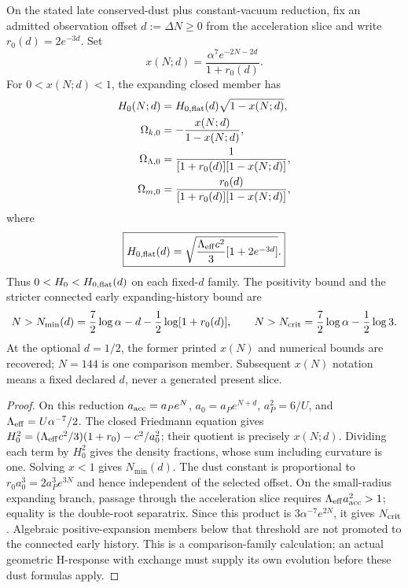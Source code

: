 \documentclass[12pt,a4paper]{article}
\begin{document}
\begin{theorem}
\label{p9:thm:closed-curvature-family-repaired}
On the stated late conserved-dust plus constant-vacuum reduction, fix
an admitted observation offset $d:=\Delta N\ge0$ from the acceleration
slice and write $r_0(d)=2e^{-3d}$. Set
\begin{equation}
\label{p9:eq:xN-def}
 x(N;d)=\frac{\alpha^7 e^{-2N-2d}}{1+r_0(d)}.
\end{equation}
For $0<x(N;d)<1$, the expanding closed member has
\begin{align}
 H_0(N;d)&=H_{0,\rm flat}(d)\sqrt{1-x(N;d)},\\
 \Omega_{k,0}&=-\frac{x(N;d)}{1-x(N;d)},\\
 \Omega_{\Lambda,0}&=\frac1{[1+r_0(d)][1-x(N;d)]},\\
 \Omega_{m,0}&=\frac{r_0(d)}{[1+r_0(d)][1-x(N;d)]},
 \label{p9:eq:closed-family}
\end{align}
where
\begin{equation}
\label{p9:eq:H0-flat-native}
 \boxed{H_{0,\rm flat}(d)=
 \sqrt{\frac{\Lambda_{\rm eff}c^2}{3}[1+2e^{-3d}]}.}
\end{equation}
Thus $0<H_0<H_{0,\rm flat}(d)$ on each fixed-$d$ family. The
positivity bound and the stricter connected early expanding-history bound are
\[
 N>N_{\min}(d)=\frac72\log\alpha-d-\frac12\log[1+r_0(d)],
 \qquad N>N_{\rm crit}=\frac72\log\alpha-\frac12\log3.
\]
At the optional $d=1/2$, the former printed $x(N)$ and numerical bounds
are recovered; $N=144$ is one comparison member. Subsequent $x(N)$
notation means a fixed declared $d$, never a generated present slice.
\end{theorem}
\begin{proof}
On this reduction $a_{\rm acc}=a_Pe^N$, $a_0=a_Pe^{N+d}$,
$a_P^2=6/U$, and $\Lambda_{\rm eff}=U\alpha^{-7}/2$.
The closed Friedmann equation gives
$H_0^2=(\Lambda_{\rm eff}c^2/3)(1+r_0)-c^2/a_0^2$;
their quotient is precisely $x(N;d)$. Dividing each term by $H_0^2$
gives the density fractions, whose sum including curvature is one.
Solving $x<1$ gives $N_{\min}(d)$. The dust constant is proportional
to $r_0a_0^3=2a_P^3e^{3N}$ and hence independent of the selected
offset. On the small-radius expanding branch, passage through the
acceleration slice requires
$\Lambda_{\rm eff}a_{\rm acc}^2>1$; equality is the double-root
separatrix. Since this product is $3\alpha^{-7}e^{2N}$, it gives
$N_{\rm crit}$. Algebraic positive-expansion members below that
threshold are not promoted to the connected early history. This is a
comparison-family calculation; an actual geometric H-response with
exchange must supply its own evolution before these dust formulas apply.
\end{proof}
\end{document}
